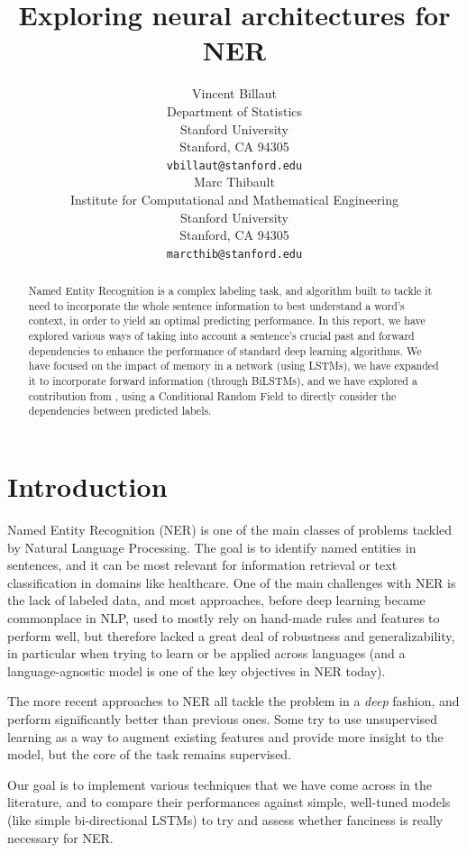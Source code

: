 \documentclass{article} %
\title{Exploring neural architectures for NER}
\author{
Vincent Billaut\\
Department of Statistics\\
Stanford University\\
Stanford, CA 94305 \\
\texttt{vbillaut@stanford.edu} \\
\And
Marc Thibault \\
Institute for Computational and Mathematical Engineering \\
Stanford University\\
Stanford, CA 94305 \\
\texttt{marcthib@stanford.edu} \\
}
\begin{document}
\maketitle

\begin{abstract}

Named Entity Recognition is a complex labeling task, and algorithm built to tackle it need to incorporate the whole sentence information to best understand a word's context, in order to yield an optimal predicting performance. In this report, we have explored various ways of taking into account a sentence's crucial past and forward dependencies to enhance the performance of standard deep learning algorithms. We have focused on the impact of memory in a network (using LSTMs), we have expanded it to incorporate forward information (through BiLSTMs), and we have explored a contribution from \cite{lample2016neural}, using a Conditional Random Field to directly consider the dependencies between predicted labels.
\end{abstract}

\section{Introduction}

Named Entity Recognition (NER) is one of the main classes of problems tackled by Natural Language Processing. The goal is to identify named entities in sentences, and it can be most relevant for information retrieval or text classification in domains like healthcare.
One of the main challenges with NER is the lack of labeled data, and
most approaches, before deep learning became commonplace in NLP, used to mostly rely on hand-made rules and features to perform well, but therefore lacked a great deal of robustness and generalizability, in particular when trying to learn or be applied across languages (and a language-agnostic model is one of the key objectives in NER today).

The more recent approaches to NER all tackle the problem in a \textit{deep} fashion, and perform significantly better than previous ones. Some try to use unsupervised learning as a way to augment existing features and provide more insight to the model, but the core of the task remains supervised.

Our goal is to implement various techniques that we have come across in the literature, and to compare their performances against simple, well-tuned models (like simple bi-directional LSTMs) to try and assess whether fanciness is really necessary for NER.
\end{document}
